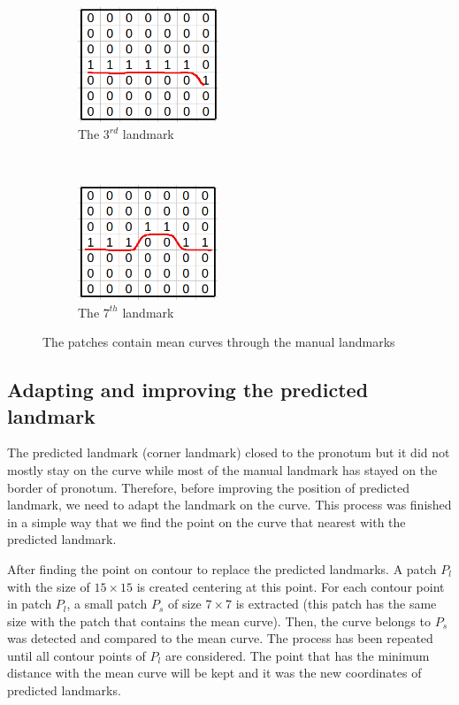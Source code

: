 \documentclass[10pt]{article}
\begin{document}
\begin{figure}[htbp]
    \centering
    \begin{subfigure}[t]{0.25\textwidth}
        \centering
        \includegraphics[height=1.35in]{images/curve_lm32}
        \caption{The $3^{rd}$ landmark}
        \label{figsub111}
    \end{subfigure}~
    \begin{subfigure}[t]{0.25\textwidth}
        \centering
        \includegraphics[height=1.35in]{images/curve_lm72}
        \caption{The $7^{th}$ landmark}
        \label{figsub221}
    \end{subfigure}
    \caption{The patches contain mean curves through the manual landmarks } 
    \label{figshapect}
\end{figure}
\subsection{Adapting and improving the predicted landmark}
The predicted landmark (corner landmark) closed to the pronotum but it did not mostly stay on the curve while most of the manual landmark has stayed on the border of pronotum. Therefore, before improving the position of predicted landmark, we need to adapt the landmark on the curve. This process was finished in a simple way that we find the point on the curve that nearest with the predicted landmark.

After finding the point on contour to replace the predicted landmarks. A patch $P_l$ with the size of $15 \times 15$ is created centering at this point. For each contour point in patch $P_l$, a small patch $P_s$ of size $7 \times 7$ is extracted (this patch has the same size with the patch that contains the mean curve). Then, the curve belongs to $P_s$ was detected and compared to the mean curve. The process has been repeated until all contour points of $P_l$ are considered. The point that has the minimum distance with the mean curve will be kept and it was the new coordinates of predicted landmarks.
\end{document}
